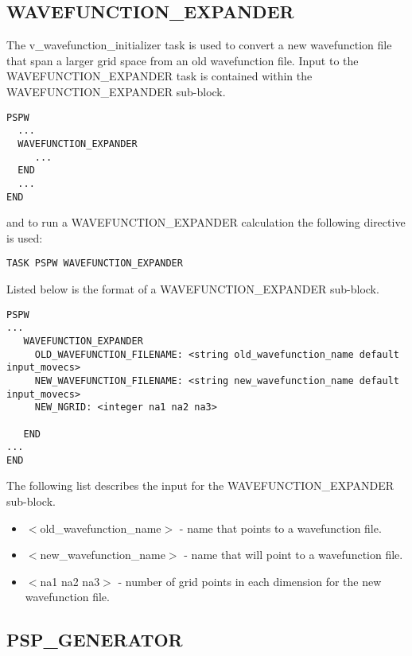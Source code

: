 \subsection{WAVEFUNCTION\_EXPANDER}
The v\_wavefunction\_initializer task is used to convert a new wavefunction
file that span a larger grid space from an old wavefunction file.
Input to the WAVEFUNCTION\_EXPANDER task is contained
within the WAVEFUNCTION\_EXPANDER sub-block.
\begin{verbatim}
PSPW
  ...
  WAVEFUNCTION_EXPANDER
     ...
  END
  ...
END
\end{verbatim}
and to run a WAVEFUNCTION\_EXPANDER calculation the following directive 
is used:
\begin{verbatim}
TASK PSPW WAVEFUNCTION_EXPANDER
\end{verbatim}
Listed below is the format of a WAVEFUNCTION\_EXPANDER sub-block.
\begin{verbatim}
PSPW
... 
   WAVEFUNCTION_EXPANDER   
     OLD_WAVEFUNCTION_FILENAME: <string old_wavefunction_name default input_movecs>
     NEW_WAVEFUNCTION_FILENAME: <string new_wavefunction_name default input_movecs>
     NEW_NGRID: <integer na1 na2 na3>
    
   END
...
END
\end{verbatim}
The following list describes the input for the WAVEFUNCTION\_EXPANDER
sub-block.
\begin{itemize}
        \item $<$old\_wavefunction\_name$>$ - name that points
              to a wavefunction file.
        \item $<$new\_wavefunction\_name$>$ - name that will 
              point to a wavefunction file.
        \item $<$na1 na2 na3$>$ - number of grid points in each dimension
              for the new wavefunction file. 
\end{itemize}



\subsection{PSP\_GENERATOR}

